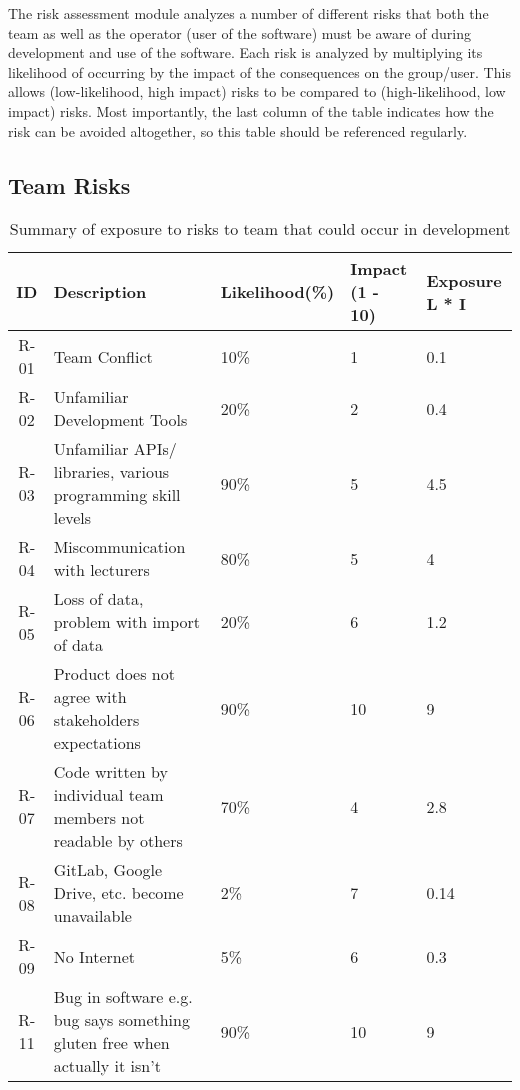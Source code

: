 The risk assessment module analyzes a number of different risks that both the team as well as the operator (user of the software) must be aware of during development and use of the software. Each risk is analyzed by multiplying its likelihood of occurring by the impact of the consequences on the group/user. This allows (low-likelihood, high impact) risks to be compared to (high-likelihood, low impact) risks. Most importantly, the last column of the table indicates how the risk can be avoided altogether, so this table should be referenced regularly.

\subsection{Team Risks}

\begin{table}[H]
\centering
\caption{Summary of exposure to risks to team that could occur in development}
\begin{tabularx}{\linewidth}{|c|X|X|X|X|}
	\hline
    ID & Description & Likelihood(\%) & Impact (1 - 10) & Exposure L * I \\
    \hline
    R-01 & Team Conflict & 10\% & 1 & 0.1 \\
    \hline
    R-02 & Unfamiliar Development Tools & 20\% & 2 & 0.4 \\
    \hline
    R-03 & Unfamiliar APIs/ libraries, various programming skill levels & 90\% & 5 & 4.5 \\
    \hline
    R-04 & Miscommunication with lecturers & 80\% & 5 & 4 \\
    \hline
    R-05 & Loss of data, problem with import of data & 20\% & 6 & 1.2 \\
    \hline
    R-06 & Product does not agree with stakeholders expectations & 90\% & 10 & 9 \\
    \hline
    R-07 & Code written by individual team members not readable by others & 70\% & 4 & 2.8 \\
    \hline
    R-08 & GitLab, Google Drive, etc. become unavailable & 2\% & 7 & 0.14 \\
    \hline
    R-09 & No Internet & 5\% & 6 & 0.3 \\
    \hline
    R-11 & Bug in software e.g. bug says something gluten free when actually it isn’t & 90\% & 10 & 9 \\
    \hline
\end{tabularx}
\end{table}

